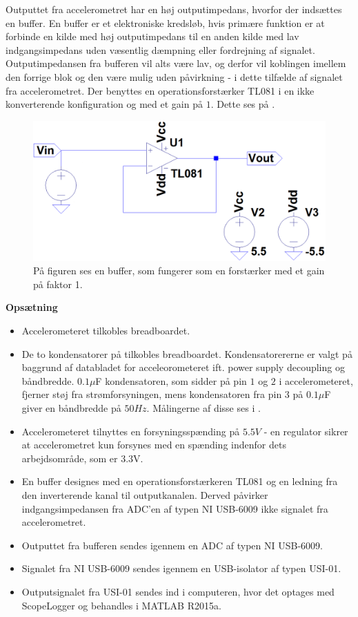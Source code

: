 \noindent Outputtet fra accelerometret har en høj outputimpedans, hvorfor der indsættes en buffer. En buffer er et elektroniske kredsløb, hvis primære funktion er at forbinde en kilde med høj outputimpedans til en anden kilde med lav indgangsimpedans uden væsentlig dæmpning eller fordrejning af signalet. Outputimpedansen fra bufferen vil alts være lav, og derfor vil koblingen imellem den forrige blok og den være mulig uden påvirkning - i dette tilfælde af signalet fra accelerometret. Der benyttes en operationsforstærker TL081 i en ikke konverterende konfiguration og med et gain på $1$.\cite{Schaumann2014} Dette ses på .
\begin{figure}[H]
	\centering
	\includegraphics[scale=0.4]{figures/cProblemloesning/Buffer_LT.png}
	\caption{På figuren ses en buffer, som fungerer som en forstærker med et gain på faktor 1.}
	\label{fig:Buffer}
\end{figure}

\textbf{Opsætning}\label{Opsaetning}
\begin{itemize}
\item Accelerometeret tilkobles breadboardet.
\item De to kondensatorer på tilkobles breadboardet. Kondensatorererne er valgt på baggrund af databladet for acceleorometeret ift. power supply decoupling og båndbredde. $0.1\mu$F kondensatoren, som sidder på pin $1$ og $2$ i accelerometeret, fjerner støj fra strømforsyningen, mens kondensatoren fra pin $3$ på $0.1\mu$F giver en båndbredde på $50Hz$. Målingerne af disse ses i .
\item Accelerometeret tilnyttes en forsyningsspænding på $5.5V$ - en regulator sikrer at accelerometret kun forsynes med en spænding indenfor dets arbejdsområde, som er $3.3$V.
\item En buffer designes med en operationsforstærkeren TL081 og en ledning fra den inverterende kanal til outputkanalen. Derved påvirker indgangsimpedansen fra ADC'en af typen NI USB-6009 ikke signalet fra accelerometret.
\item Outputtet fra bufferen sendes igennem en ADC af typen NI USB-6009.
\item Signalet fra NI USB-6009 sendes igennem en USB-isolator af typen USI-01.
\item Outputsignalet fra USI-01 sendes ind i computeren, hvor det optages med ScopeLogger og behandles i MATLAB R2015a.
\end{itemize}

